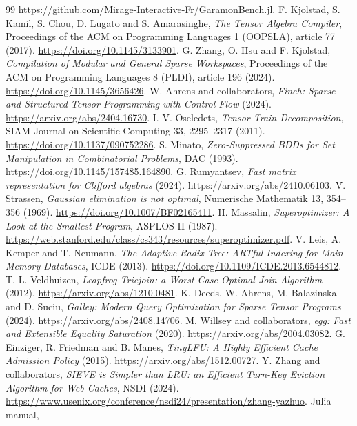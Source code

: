 \documentclass[11pt,a4paper]{article}
\begin{document}
\begin{thebibliography}{99}
\url{https://github.com/Mirage-Interactive-Fr/GaramonBench.jl}.
 F. Kjolstad, S. Kamil, S. Chou, D. Lugato and
S. Amarasinghe, \emph{The Tensor Algebra Compiler},
Proceedings of the ACM on Programming Languages 1 (OOPSLA),
article 77 (2017).
\url{https://doi.org/10.1145/3133901}.
 G. Zhang, O. Hsu and F. Kjolstad,
\emph{Compilation of Modular and General Sparse Workspaces},
Proceedings of the ACM on Programming Languages 8 (PLDI),
article 196 (2024).
\url{https://doi.org/10.1145/3656426}.
 W. Ahrens and collaborators,
\emph{Finch: Sparse and Structured Tensor Programming with
Control Flow} (2024).
\url{https://arxiv.org/abs/2404.16730}.
 I. V. Oseledets, \emph{Tensor-Train
Decomposition}, SIAM Journal on Scientific Computing 33,
2295--2317 (2011).
\url{https://doi.org/10.1137/090752286}.
 S. Minato, \emph{Zero-Suppressed BDDs for Set
Manipulation in Combinatorial Problems}, DAC (1993).
\url{https://doi.org/10.1145/157485.164890}.
 G. Rumyantsev,
\emph{Fast matrix representation for Clifford algebras} (2024).
\url{https://arxiv.org/abs/2410.06103}.
 V. Strassen,
\emph{Gaussian elimination is not optimal}, Numerische Mathematik
13, 354--356 (1969).
\url{https://doi.org/10.1007/BF02165411}.
 H. Massalin,
\emph{Superoptimizer: A Look at the Smallest Program}, ASPLOS II
(1987).
\url{https://web.stanford.edu/class/cs343/resources/superoptimizer.pdf}.
 V. Leis, A. Kemper and T. Neumann,
\emph{The Adaptive Radix Tree: ARTful Indexing for Main-Memory
Databases}, ICDE (2013).
\url{https://doi.org/10.1109/ICDE.2013.6544812}.
 T. L. Veldhuizen, \emph{Leapfrog Triejoin:
a Worst-Case Optimal Join Algorithm} (2012).
\url{https://arxiv.org/abs/1210.0481}.
 K. Deeds, W. Ahrens, M. Balazinska and
D. Suciu, \emph{Galley: Modern Query Optimization for Sparse
Tensor Programs} (2024).
\url{https://arxiv.org/abs/2408.14706}.
 M. Willsey and collaborators,
\emph{egg: Fast and Extensible Equality Saturation} (2020).
\url{https://arxiv.org/abs/2004.03082}.
 G. Einziger, R. Friedman and B. Manes,
\emph{TinyLFU: A Highly Efficient Cache Admission Policy} (2015).
\url{https://arxiv.org/abs/1512.00727}.
 Y. Zhang and collaborators,
\emph{SIEVE is Simpler than LRU: an Efficient Turn-Key Eviction
Algorithm for Web Caches}, NSDI (2024).
\url{https://www.usenix.org/conference/nsdi24/presentation/zhang-yazhuo}.
 Julia manual,

\end{thebibliography}
\end{document}
